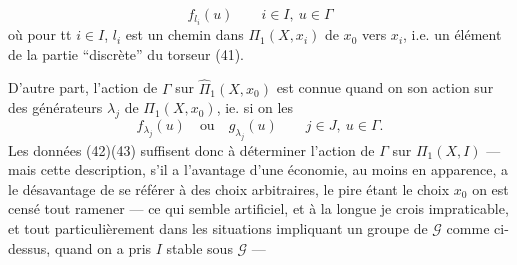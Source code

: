 \[
\tag{41}f_{l_i}(u)\qquad i\in I,\ u\in\Gamma
\]
où pour tt $i\in I$, $l_i$ est un chemin dans $\Pi_1(X,x_i)$ de $x_0$ vers $x_i$, i.e. un élément de la partie ``discrète'' du torseur (41).

D'autre part, l'action de $\Gamma$ sur $\widehat\Pi_1(X,x_0)$ est connue quand on  son action sur des générateurs $\lambda_j$  de $\Pi_1(X,x_0)$, ie. si on  les
\[
\tag{43}f_{\lambda_j}(u)\quad\text{ou}\quad g_{\lambda_j}(u)\qquad j\in J,\ u\in\Gamma.
\]
 Les données (42)(43) suffisent donc à déterminer l'action de $\Gamma$ sur $\Pi_1(X,I)$ --- mais cette description,   s'il a l'avantage d'une économie, au moins en apparence, a le désavantage de se référer à des choix arbitraires, le pire étant le choix    $x_0$   on est censé tout ramener --- ce qui semble artificiel, et à la longue je crois impraticable,  et tout particulièrement dans les situations impliquant un groupe de  $\mathcal G$ comme ci-dessus, quand on a pris $I$ stable sous $\mathcal G$ ---
